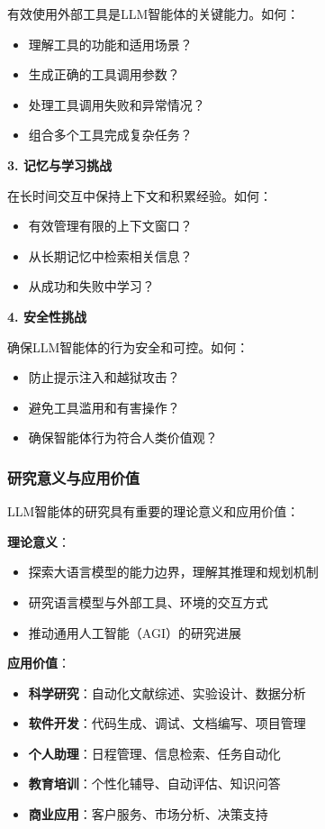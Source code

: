 有效使用外部工具是LLM智能体的关键能力。如何：
\begin{itemize}
    \item 理解工具的功能和适用场景？
    \item 生成正确的工具调用参数？
    \item 处理工具调用失败和异常情况？
    \item 组合多个工具完成复杂任务？
\end{itemize}

\textbf{3. 记忆与学习挑战}

在长时间交互中保持上下文和积累经验。如何：
\begin{itemize}
    \item 有效管理有限的上下文窗口？
    \item 从长期记忆中检索相关信息？
    \item 从成功和失败中学习？
\end{itemize}

\textbf{4. 安全性挑战}

确保LLM智能体的行为安全和可控。如何：
\begin{itemize}
    \item 防止提示注入和越狱攻击？
    \item 避免工具滥用和有害操作？
    \item 确保智能体行为符合人类价值观？
\end{itemize}

\subsubsection{研究意义与应用价值}

LLM智能体的研究具有重要的理论意义和应用价值：

\textbf{理论意义}：
\begin{itemize}
    \item 探索大语言模型的能力边界，理解其推理和规划机制
    \item 研究语言模型与外部工具、环境的交互方式
    \item 推动通用人工智能（AGI）的研究进展
\end{itemize}

\textbf{应用价值}：
\begin{itemize}
    \item \textbf{科学研究}：自动化文献综述、实验设计、数据分析
    \item \textbf{软件开发}：代码生成、调试、文档编写、项目管理
    \item \textbf{个人助理}：日程管理、信息检索、任务自动化
    \item \textbf{教育培训}：个性化辅导、自动评估、知识问答
    \item \textbf{商业应用}：客户服务、市场分析、决策支持
\end{itemize}

